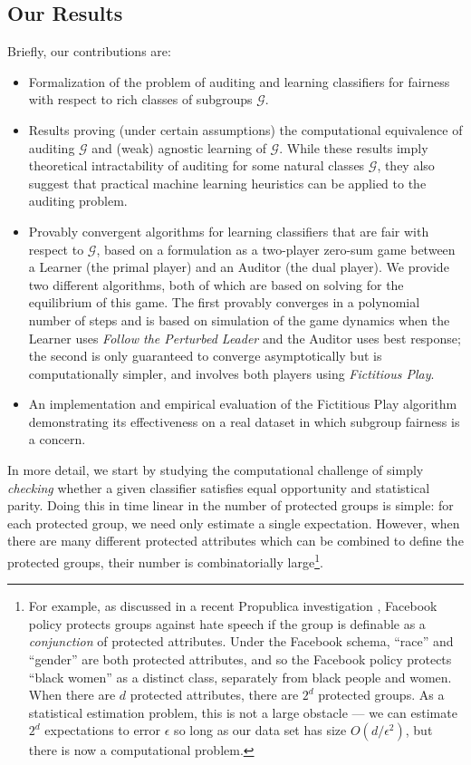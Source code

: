 \subsection{Our Results}

Briefly, our contributions are:
\begin{itemize}
	\item Formalization of the problem of auditing and learning classifiers	
		for fairness with respect to rich classes of subgroups $\mathcal{G}$.
	\item Results proving (under certain assumptions)
		the computational equivalence of auditing
		$\mathcal{G}$ and (weak) agnostic learning of $\mathcal{G}$.
		While these results imply theoretical intractability of auditing for some
		natural classes $\mathcal{G}$, they also suggest that practical machine
		learning heuristics can be applied to the auditing problem.
	\item Provably convergent algorithms for learning classifiers
		that are fair with respect to $\mathcal{G}$, based on a formulation
		as a two-player zero-sum game between a Learner (the primal player) and
		an Auditor (the dual player). We provide two different algorithms, both of which are based on solving for the equilibrium of this game.
		The first provably converges in a polynomial number of steps and is based on simulation of the game dynamics when the Learner
		uses {\em Follow the Perturbed Leader\/} and the Auditor uses best response; the second
		is only guaranteed to converge asymptotically but is computationally simpler, and involves both players using
		{\em Fictitious Play\/}. %
	\item An implementation and empirical evaluation of the Fictitious Play algorithm demonstrating its
		effectiveness on a real dataset in which subgroup fairness is a concern.
		
\end{itemize}

In more detail,
we start by studying the computational challenge of simply \emph{checking} whether a given classifier satisfies equal opportunity and statistical parity. Doing this in time linear in the number of protected groups is simple: for each protected group, we need only estimate a single expectation. However, when there are many different protected attributes which can be combined to define the protected groups, their number is combinatorially large\footnote{For example, as discussed in a recent Propublica investigation \citep{propublicafacebook}, Facebook policy protects groups against hate speech if the group is definable as a \emph{conjunction} of protected attributes.  Under the Facebook schema, ``race'' and ``gender'' are both protected attributes, and so the Facebook policy protects ``black women'' as a distinct class, separately from black people and women.  When there are $d$ protected attributes, there are $2^d$ protected groups. As a statistical estimation problem, this is not a large obstacle --- we can estimate $2^d$ expectations to error $\epsilon$ so long as our data set has size $O(d/\epsilon^2)$, but there is now a computational problem.}.

